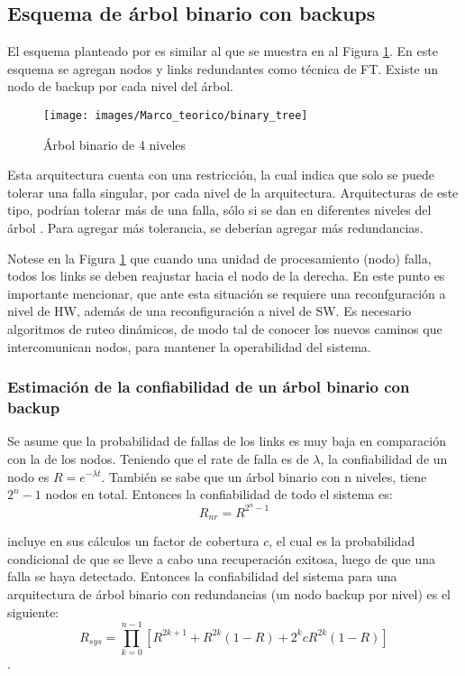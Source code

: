 \subsection{Esquema de árbol binario con backups}
El esquema planteado por \cite{Raghavendra84} es similar al que se muestra en al Figura 
\ref{fig:binary_tree}. En este esquema se agregan nodos y links redundantes como técnica de \ac{FT}. 
Existe un nodo de backup por cada nivel del árbol.

\begin{figure}[h]
 \centering
 \texttt{[image: images/Marco\_teorico/binary\_tree]}
  \caption{Árbol binario de 4 niveles}  
\label{fig:binary_tree} 
\end{figure}

Esta arquitectura cuenta con una restricción, la cual indica que solo se puede tolerar una 
falla singular, por cada nivel de la arquitectura. Arquitecturas de este tipo, podrían tolerar más 
de una falla, sólo si se dan en diferentes niveles del árbol \citep{Raghavendra84}. Para agregar 
más tolerancia, se deberían agregar más redundancias.

Notese en la Figura \ref{fig:binary_tree} que cuando una unidad de procesamiento (nodo) falla, 
todos los links se deben reajustar hacia el nodo de la derecha. En este punto es importante 
mencionar, que ante esta situación se requiere una reconfguración a nivel de \ac{HW}, además de una 
reconfiguración a nivel de \ac{SW}. Es necesario algoritmos de ruteo dinámicos, de modo tal de 
conocer los nuevos caminos que intercomunican nodos, para mantener la operabilidad del sistema.  

\subsubsection{Estimación de la confiabilidad de un árbol binario con backup}
Se asume que la probabilidad de fallas de los links es muy baja en comparación con la de los nodos. 
Teniendo que el rate de falla es de $\lambda$, la confiabilidad  de un nodo es $R = e^{-\lambda 
t}$. También se sabe que un árbol binario con n niveles,  tiene $2^n - 1$ nodos en total. 
Entonces la confiabilidad de todo el sistema es: $$R_{nr} = R^{2^n - 1}$$

\cite{Raghavendra84} incluye en sus cálculos un factor de cobertura $c$, el cual es la probabilidad 
condicional de que se lleve a cabo una recuperación exitosa, luego de que una falla se haya 
detectado. Entonces la confiabilidad del sistema para una arquitectura de árbol binario con 
redundancias (un nodo backup por nivel) es el siguiente: $$R_{sys} = \prod_{k=0}^{n-1}{[R^{2k +1} + 
R^{2k}(1-R) + 2^kcR^{2k}(1-R)]}$$.

